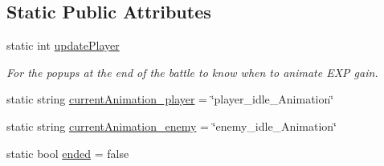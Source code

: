 \subsection*{Static Public Attributes}
\begin{DoxyCompactItemize}
\item 
static int \mbox{\hyperlink{class_gameplay_acd7f7caba8d780232371c187cdf8fcc8}{update\+Player}}
\begin{DoxyCompactList}\small\item\em For the popups at the end of the battle to know when to animate E\+XP gain. \end{DoxyCompactList}\item 
static string \mbox{\hyperlink{class_gameplay_a4c1b8e45bd5eadbb4a9d876be085ffe6}{current\+Animation\+\_\+player}} = \char`\"{}player\+\_\+idle\+\_\+\+Animation\char`\"{}
\item 
static string \mbox{\hyperlink{class_gameplay_ab7decfcd8cb7caa5262c05a80d56b564}{current\+Animation\+\_\+enemy}} = \char`\"{}enemy\+\_\+idle\+\_\+\+Animation\char`\"{}
\item 
static bool \mbox{\hyperlink{class_gameplay_a2a5861c6013001df52b09f53f9194e87}{ended}} = false
\end{DoxyCompactItemize}
